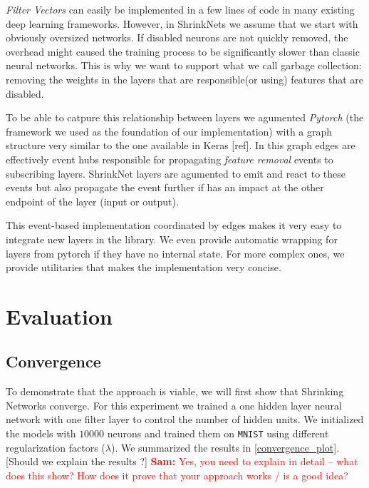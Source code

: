 \documentclass[sigconf]{acmart}
\newcommand{\srm}[1]{\textcolor{red}{{\bf Sam:} #1}}
\begin{document}
\par \textit{Filter Vectors} can easily be implemented in a few lines of code
in many existing deep learning frameworks. However, in ShrinkNets we assume
that we start with obviously oversized networks. If disabled neurons are not
quickly removed, the overhead might caused the training process to be
significantly slower than classic neural networks. This is why we want to
support what we call garbage collection: removing the weights in the layers
that are responsible(or using) features that are disabled.
\par To be able to catpure this relationship between layers we agumented
\textit{Pytorch} (the framework we used as the foundation of our implementation)
with a graph structure very similar to the one available in Keras [ref].
In this graph edges are effectively event hubs responsible for propagating
\textit{feature removal} events to subscribing layers. ShrinkNet layers are
agumented to emit and react to these events but also propagate the event
further if has an impact at the other endpoint of the layer (input or output).
\par This event-based implementation coordinated by edges makes it very easy
to integrate new layers in the library. We even provide automatic wrapping
for layers from pytorch if they have no internal state. For more complex ones,
we provide utilitaries that makes the implementation very concise.


\section{Evaluation}
\subsection{Convergence}

To demonstrate that the approach is viable, we will first show that Shrinking
Networks converge. For this experiment we trained a one hidden layer neural
network with one filter layer to control the number of hidden units. We
initialized the models with $10000$ neurons and trained them on \texttt{MNIST}
using different regularization factors ($\lambda$). We summarized the results in
\autoref{convergence_plot}. [Should we explain the results ?] \srm{Yes, you need
to explain in detail -- what does this show?  How does it prove that your
approach works / is a good idea?}
\end{document}
